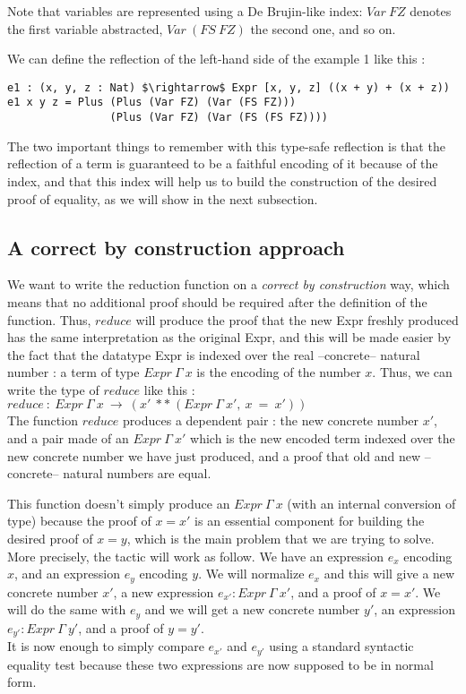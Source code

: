 Note that variables are represented using a De Brujin-like index: $Var\:FZ$ denotes the first variable abstracted, $Var\:(FS\:FZ)$ the second one, and so on.

We can define the reflection of the left-hand side of the example 1 like this :
\begin{lstlisting}
e1 : (x, y, z : Nat) $\rightarrow$ Expr [x, y, z] ((x + y) + (x + z))
e1 x y z = Plus (Plus (Var FZ) (Var (FS FZ))) 
                (Plus (Var FZ) (Var (FS (FS FZ))))
\end{lstlisting}

The two important things to remember with this type-safe reflection is that the reflection of a term is guaranteed to be a faithful encoding of it because of the index, and that this index will help us to build the construction of the desired proof of equality, as we will show in the next subsection.


	\subsection{A correct by construction approach}
\label{sect:aCorrectByConstructionApproach}

We want to write the reduction function on a \emph{correct by construction} way, which means that no additional proof should be required after the definition of the function. Thus, $reduce$ will produce the proof that the new Expr freshly produced has the same interpretation as the original Expr, and this will be made easier by the fact that the datatype Expr is indexed over the real --concrete-- natural number : a term of type $Expr\ \Gamma\ x$ is the encoding of the number $x$.
Thus, we can write the type of $reduce$ like this : \\
$reduce\ :\ Expr\ \Gamma\ x\ \rightarrow\ (x'\ **\ (Expr\ \Gamma\ x',\ x\ =\ x'))$ \\
The function $reduce$ produces a dependent pair : the new concrete number $x'$, and a pair made of an $Expr\ \Gamma\ x'$ which is the new encoded term indexed over the new concrete number we have just produced, and a proof that old and new --concrete-- natural numbers are equal.

This function doesn't simply produce an $Expr\ \Gamma\ x$ (with an internal conversion of type) because the proof of $x=x'$ is an essential component for building the desired proof of $x=y$, which is the main problem that we are trying to solve. More precisely, the tactic will work as follow.
We have an expression $e_x$ encoding $x$, and an expression $e_y$ encoding $y$. We will normalize $e_x$ and this will give a new concrete number $x'$, a new expression $e_{x'}:Expr\ \Gamma\ x'$, and a proof of $x=x'$. We will do the same with $e_y$ and we will get a new concrete number $y'$, an expression $e_{y'}:Expr\ \Gamma\ y'$, and a proof of $y=y'$. \\
It is now enough to simply compare $e_{x'}$ and $e_{y'}$ using a standard syntactic equality test because these two expressions are now supposed to be in normal form.


